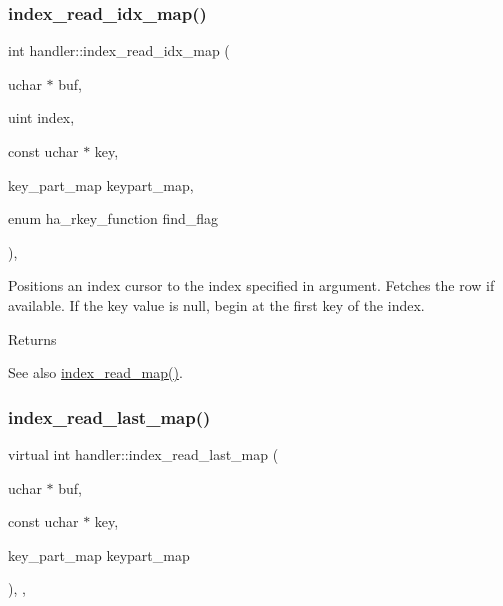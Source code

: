 \subsubsection{\texorpdfstring{index\+\_\+read\+\_\+idx\+\_\+map()}{index\_read\_idx\_map()}}
{\footnotesize\ttfamily int handler\+::index\+\_\+read\+\_\+idx\+\_\+map (\begin{DoxyParamCaption}\item[{uchar $\ast$}]{buf,  }\item[{uint}]{index,  }\item[{const uchar $\ast$}]{key,  }\item[{key\+\_\+part\+\_\+map}]{keypart\+\_\+map,  }\item[{enum ha\+\_\+rkey\+\_\+function}]{find\+\_\+flag }\end{DoxyParamCaption})\hspace{0.3cm}{\ttfamily [protected]}, {\ttfamily [virtual]}}



Positions an index cursor to the index specified in argument. Fetches the row if available. If the key value is null, begin at the first key of the index. 

\begin{DoxyReturn}{Returns}

\end{DoxyReturn}
\begin{DoxySeeAlso}{See also}
\mbox{\hyperlink{classhandler_af8c2b258691e5baac8dd22d19c084b37}{index\+\_\+read\+\_\+map()}}. 
\end{DoxySeeAlso}
\mbox{\label{classhandler_ae069d5991214e1fdf14cc44fd865a180}} 
\subsubsection{\texorpdfstring{index\+\_\+read\+\_\+last\+\_\+map()}{index\_read\_last\_map()}}
{\footnotesize\ttfamily virtual int handler\+::index\+\_\+read\+\_\+last\+\_\+map (\begin{DoxyParamCaption}\item[{uchar $\ast$}]{buf,  }\item[{const uchar $\ast$}]{key,  }\item[{key\+\_\+part\+\_\+map}]{keypart\+\_\+map }\end{DoxyParamCaption})\hspace{0.3cm}{\ttfamily [inline]}, {\ttfamily [protected]}, {\ttfamily [virtual]}}



